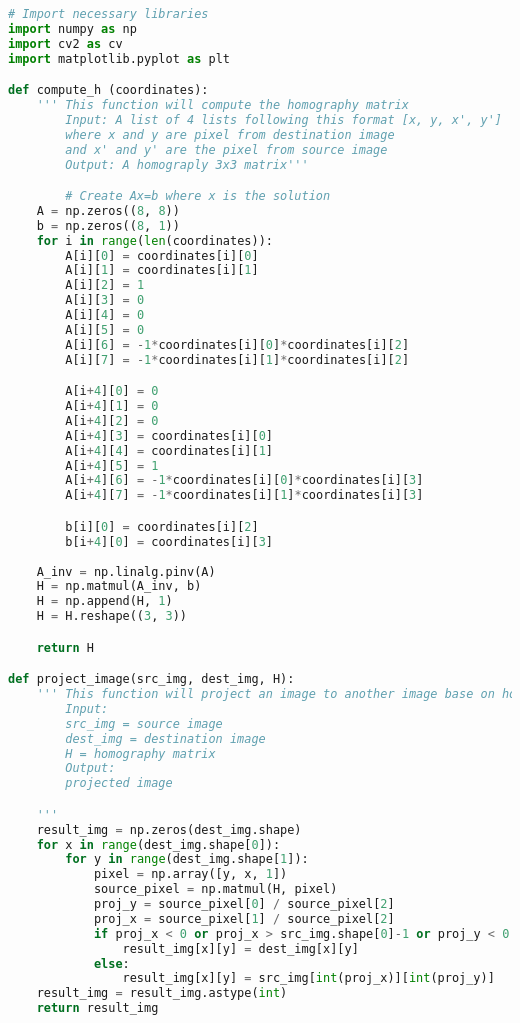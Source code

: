 \documentclass[11pt]{article}
\begin{document}
\begin{lstlisting}[language=Python, showstringspaces=false]
# Import necessary libraries
import numpy as np
import cv2 as cv
import matplotlib.pyplot as plt  

def compute_h (coordinates):
    ''' This function will compute the homography matrix
        Input: A list of 4 lists following this format [x, y, x', y']
        where x and y are pixel from destination image
        and x' and y' are the pixel from source image
        Output: A homograply 3x3 matrix'''

        # Create Ax=b where x is the solution
    A = np.zeros((8, 8))
    b = np.zeros((8, 1))
    for i in range(len(coordinates)):
        A[i][0] = coordinates[i][0]
        A[i][1] = coordinates[i][1]
        A[i][2] = 1
        A[i][3] = 0
        A[i][4] = 0
        A[i][5] = 0
        A[i][6] = -1*coordinates[i][0]*coordinates[i][2]
        A[i][7] = -1*coordinates[i][1]*coordinates[i][2]

        A[i+4][0] = 0
        A[i+4][1] = 0
        A[i+4][2] = 0
        A[i+4][3] = coordinates[i][0]
        A[i+4][4] = coordinates[i][1]
        A[i+4][5] = 1
        A[i+4][6] = -1*coordinates[i][0]*coordinates[i][3]
        A[i+4][7] = -1*coordinates[i][1]*coordinates[i][3]

        b[i][0] = coordinates[i][2]
        b[i+4][0] = coordinates[i][3]
    
    A_inv = np.linalg.pinv(A)
    H = np.matmul(A_inv, b)
    H = np.append(H, 1)
    H = H.reshape((3, 3))

    return H

def project_image(src_img, dest_img, H):
    ''' This function will project an image to another image base on homography
        Input: 
        src_img = source image
        dest_img = destination image
        H = homography matrix
        Output: 
        projected image

    '''
    result_img = np.zeros(dest_img.shape)
    for x in range(dest_img.shape[0]):
        for y in range(dest_img.shape[1]):
            pixel = np.array([y, x, 1])
            source_pixel = np.matmul(H, pixel)
            proj_y = source_pixel[0] / source_pixel[2]
            proj_x = source_pixel[1] / source_pixel[2]
            if proj_x < 0 or proj_x > src_img.shape[0]-1 or proj_y < 0 or proj_y > src_img.shape[1]-1:
                result_img[x][y] = dest_img[x][y]
            else:
                result_img[x][y] = src_img[int(proj_x)][int(proj_y)]
    result_img = result_img.astype(int)
    return result_img


\end{lstlisting}
\end{document}
